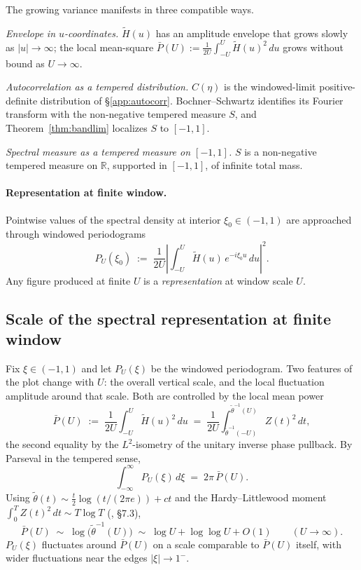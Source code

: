 \documentclass[11pt]{article}
\begin{document}
The growing variance manifests in three compatible ways.

\emph{Envelope in $u$-coordinates.} $\tilde H(u)$ has an amplitude envelope that grows slowly as $|u|\to\infty$; the local mean-square $\bar P(U):=\tfrac{1}{2U}\int_{-U}^{U}\tilde H(u)^2\,du$ grows without bound as $U\to\infty$.

\emph{Autocorrelation as a tempered distribution.} $C(\eta)$ is the windowed-limit positive-definite distribution of \S\ref{app:autocorr}. Bochner--Schwartz identifies its Fourier transform with the non-negative tempered measure $S$, and Theorem~\ref{thm:bandlim} localizes $S$ to $[-1,1]$.

\emph{Spectral measure as a tempered measure on $[-1,1]$.} $S$ is a non-negative tempered measure on $\mathbb{R}$, supported in $[-1,1]$, of infinite total mass.

\paragraph{Representation at finite window.}
Pointwise values of the spectral density at interior $\xi_0\in(-1,1)$ are approached through windowed periodograms
\[
P_U(\xi_0) \;:=\; \frac{1}{2U}\!\left|\int_{-U}^{U}\tilde H(u)\,e^{-i\xi_0 u}\,du\right|^2.
\]
Any figure produced at finite $U$ is a \emph{representation} at window scale $U$.

\subsection{Scale of the spectral representation at finite window}\label{app:windowscale}

Fix $\xi\in(-1,1)$ and let $P_U(\xi)$ be the windowed periodogram. Two features of the plot change with $U$: the overall vertical scale, and the local fluctuation amplitude around that scale. Both are controlled by the local mean power
\[
\bar P(U) \;:=\; \frac{1}{2U}\int_{-U}^{U}\tilde H(u)^2\,du \;=\; \frac{1}{2U}\int_{\tilde\theta^{-1}(-U)}^{\tilde\theta^{-1}(U)}\!\! Z(t)^2\,dt,
\]
the second equality by the $L^2$-isometry of the unitary inverse phase pullback. By Parseval in the tempered sense,
\[
\int_{-\infty}^{\infty}P_U(\xi)\,d\xi \;=\; 2\pi\,\bar P(U).
\]
Using $\tilde\theta(t)\sim\tfrac{t}{2}\log(t/(2\pi e))+ct$ and the Hardy--Littlewood moment $\int_0^T Z(t)^2\,dt\sim T\log T$ (\cite{Titchmarsh}, \S7.3),
\[
\bar P(U) \;\sim\; \log\!\big(\tilde\theta^{-1}(U)\big) \;\sim\; \log U + \log\log U + O(1)\qquad (U\to\infty).
\]
$P_U(\xi)$ fluctuates around $\bar P(U)$ on a scale comparable to $\bar P(U)$ itself, with wider fluctuations near the edges $|\xi|\to 1^-$.
\end{document}
